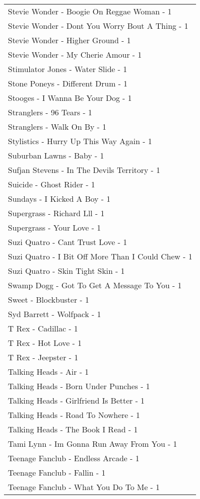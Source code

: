 \documentclass[
]{article}
\begin{document}
\begin{longtable}{l}
Stevie Wonder - Boogie On Reggae Woman - 1 \\ 
Stevie Wonder - Dont You Worry Bout A Thing - 1 \\ 
Stevie Wonder - Higher Ground - 1 \\ 
Stevie Wonder - My Cherie Amour - 1 \\ 
Stimulator Jones - Water Slide - 1 \\ 
Stone Poneys - Different Drum - 1 \\ 
Stooges - I Wanna Be Your Dog - 1 \\ 
Stranglers - 96 Tears - 1 \\ 
Stranglers - Walk On By - 1 \\ 
Stylistics - Hurry Up This Way Again - 1 \\ 
Suburban Lawns - Baby - 1 \\ 
Sufjan Stevens - In The Devils Territory - 1 \\ 
Suicide - Ghost Rider - 1 \\ 
Sundays - I Kicked A Boy - 1 \\ 
Supergrass - Richard Lll - 1 \\ 
Supergrass - Your Love - 1 \\ 
Suzi Quatro - Cant Trust Love - 1 \\ 
Suzi Quatro - I Bit Off More Than I Could Chew - 1 \\ 
Suzi Quatro - Skin Tight Skin - 1 \\ 
Swamp Dogg - Got To Get A Message To You - 1 \\ 
Sweet - Blockbuster - 1 \\ 
Syd Barrett - Wolfpack - 1 \\ 
T Rex - Cadillac - 1 \\ 
T Rex - Hot Love - 1 \\ 
T Rex - Jeepster - 1 \\ 
Talking Heads - Air - 1 \\ 
Talking Heads - Born Under Punches - 1 \\ 
Talking Heads - Girlfriend Is Better - 1 \\ 
Talking Heads - Road To Nowhere - 1 \\ 
Talking Heads - The Book I Read - 1 \\ 
Tami Lynn - Im Gonna Run Away From You - 1 \\ 
Teenage Fanclub - Endless Arcade - 1 \\ 
Teenage Fanclub - Fallin - 1 \\ 
Teenage Fanclub - What You Do To Me - 1 \\ 

\end{longtable}
\end{document}
